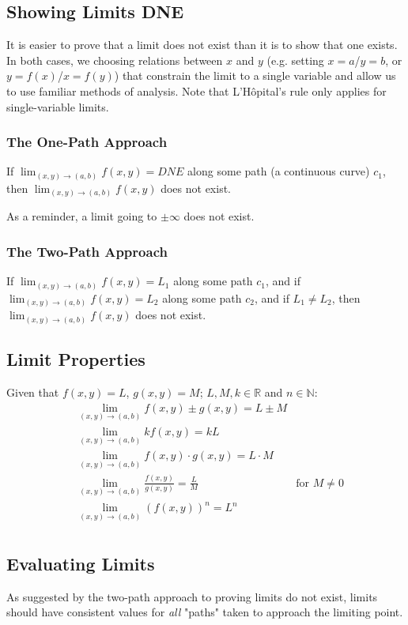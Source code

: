 \documentclass{article}
\begin{document}
\subsection{Showing Limits DNE}
It is easier to prove that a limit does not exist than it is to show that one exists. In both cases, we choosing relations between $x$ and $y$ (e.g. setting $x=a$/$y=b$, or $y=f(x)$/$x=f(y)$) that constrain the limit to a single variable and allow us to use familiar methods of analysis. Note that L'Hôpital's rule only applies for single-variable limits.

\subsubsection{The One-Path Approach}
If \(\lim_{(x,y)\to(a,b)}f(x,y) = DNE\) along some path (a continuous curve) $c_1$, then \(\lim_{(x,y)\to(a,b)}f(x,y)\) does not exist.

As a reminder, a limit going to $\pm\infty$ does not exist.

\subsubsection{The Two-Path Approach}
If \(\lim_{(x,y)\to(a,b)}f(x,y) = L_1\) along some path $c_1$, and if \(\lim_{(x,y)\to(a,b)}f(x,y) = L_2\) along some path $c_2$, and if $L_1\ne L_2$, then \(\lim_{(x,y)\to(a,b)}f(x,y)\) does not exist.

\subsection{Limit Properties}
Given that $f(x,y)=L$, $g(x,y)=M$; $L,M,k\in\mathbb{R}$ and $n\in\mathbb{N}$:
\begin{align*}
    &\lim_{(x,y)\to(a,b)}f(x,y)\pm g(x,y) = L \pm M \\
    &\lim_{(x,y)\to(a,b)}kf(x,y) = kL \\
    &\lim_{(x,y)\to(a,b)}f(x,y) \cdot g(x,y) = L \cdot M \\
    &\lim_{(x,y)\to(a,b)}\frac{f(x,y)}{g(x,y)} = \frac{L}{M} & \text{for } M\ne0 \\
    &\lim_{(x,y)\to(a,b)}(f(x,y))^n = L^n \\
\end{align*}

\subsection{Evaluating Limits}
As suggested by the two-path approach to proving limits do not exist, limits should have consistent values for \emph{all} "paths" taken to approach the limiting point.
\end{document}
